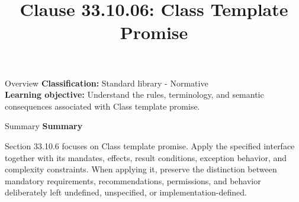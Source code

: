 \documentclass[10pt,letterpaper]{article}
\title{Clause 33.10.06: Class Template Promise}
\author{}
\date{}
\begin{document}
\maketitle
\begin{CornellOverviewBox}{Overview}
\textbf{Classification:} Standard library - Normative\\[2pt]
\textbf{Learning objective:} Understand the rules, terminology, and semantic consequences associated with Class template promise.
\end{CornellOverviewBox}\begin{CornellSummaryBox}{Summary}
{\sffamily\bfseries\color{Accent} Summary}\par\vspace{3pt}Section 33.10.6 focuses on Class template promise. Apply the specified interface together with its mandates, effects, result conditions, exception behavior, and complexity constraints. When applying it, preserve the distinction between mandatory requirements, recommendations, permissions, and behavior deliberately left undefined, unspecified, or implementation-defined.
\end{CornellSummaryBox}
\end{document}
